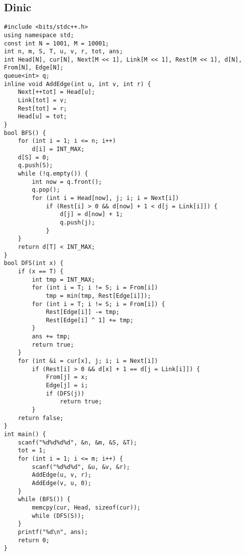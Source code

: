 \documentclass[a4paper]{article}
\begin{document}
\subsection{Dinic}
\begin{lstlisting}
#include <bits/stdc++.h>
using namespace std;
const int N = 1001, M = 10001;
int n, m, S, T, u, v, r, tot, ans;
int Head[N], cur[N], Next[M << 1], Link[M << 1], Rest[M << 1], d[N], From[N], Edge[N];
queue<int> q;
inline void AddEdge(int u, int v, int r) {
    Next[++tot] = Head[u];
    Link[tot] = v;
    Rest[tot] = r;
    Head[u] = tot;
}
bool BFS() {
    for (int i = 1; i <= n; i++)
        d[i] = INT_MAX;
    d[S] = 0;
    q.push(S);
    while (!q.empty()) {
        int now = q.front();
        q.pop();
        for (int i = Head[now], j; i; i = Next[i])
            if (Rest[i] > 0 && d[now] + 1 < d[j = Link[i]]) {
                d[j] = d[now] + 1;
                q.push(j);
            }
    }
    return d[T] < INT_MAX;
}
bool DFS(int x) {
    if (x == T) {
        int tmp = INT_MAX;
        for (int i = T; i != S; i = From[i])
            tmp = min(tmp, Rest[Edge[i]]);
        for (int i = T; i != S; i = From[i]) {
            Rest[Edge[i]] -= tmp;
            Rest[Edge[i] ^ 1] += tmp;
        }
        ans += tmp;
        return true;
    }
    for (int &i = cur[x], j; i; i = Next[i])
        if (Rest[i] > 0 && d[x] + 1 == d[j = Link[i]]) {
            From[j] = x;
            Edge[j] = i;
            if (DFS(j))
                return true;
        }
    return false;
}
int main() {
    scanf("%d%d%d%d", &n, &m, &S, &T);
    tot = 1;
    for (int i = 1; i <= m; i++) {
        scanf("%d%d%d", &u, &v, &r);
        AddEdge(u, v, r);
        AddEdge(v, u, 0);
    }
    while (BFS()) {
        memcpy(cur, Head, sizeof(cur));
        while (DFS(S));
    }
    printf("%d\n", ans);
    return 0;
}
\end{lstlisting}
\end{document}
